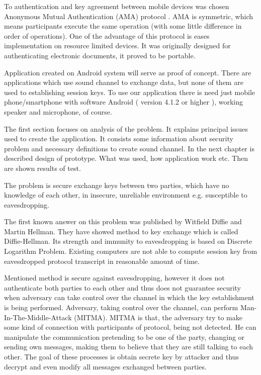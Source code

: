 \documentclass[11pt,titlepage]{article}
\theoremstyle{plain}
\begin{document}
\vspace{5mm}

To authentication and key agreement between mobile devices was chosen Anonymous Mutual Authentication (AMA) protocol \cite{AMA}. AMA is symmetric, which means  participants execute the same operation (with some little difference in order of operations). One of
the advantage of this protocol is eases implementation on resource limited devices. It was originally designed for authenticating electronic documents, it proved to be portable.

\vspace{5mm}

Application created on Android system will serve as proof of concept. There are applications which use sound channel to exchange data, but none of them are used to establishing session keys. To use our application there is need just mobile phone/smartphone with software Android ( version 4.1.2 or higher ), working speaker and microphone, of course.

\vspace{5mm}

The first section focuses on analysis of the problem. It explains principal issues used to create the application. It consists some information about security problem and necessary definitions to create sound channel. In the next chapter is described design of prototype. What was used, how application work etc. Then are shown results of test.

\vspace{5mm}

The problem is secure exchange keys between two parties, which have no knowledge of each other, in insecure, unreliable environment e.g. susceptible to eavesdropping.

\vspace{5mm}

The first known answer on this problem was published by Witfield Diffie and Martin Hellman. They have showed method to key exchange which is called Diffie-Hellman. Its strength and immunity to eavesdropping is based on Discrete Logarithm Problem. Existing computers are not able to compute session key from eavesdropped protocol transcript in reasonable amount of time.

\vspace{5mm}

Mentioned method is secure against eavesdropping, however it does not authenticate both parties to each other and thus does not guarantee security when adversary can take control over the channel in which the key establishment is being performed. Adversary, taking control over the channel, can perform Man-In-The-Middle-Attack (MITMA). MITMA is that, the adversary try to make some kind of connection with participants of protocol, being not detected. He can manipulate the communication pretending to be one of the party, changing or sending own messages, making them to believe that they are still talking to each other. The goal of these processes is obtain secrete key by attacker and thus decrypt and even modify all messages exchanged between parties.
\end{document}
